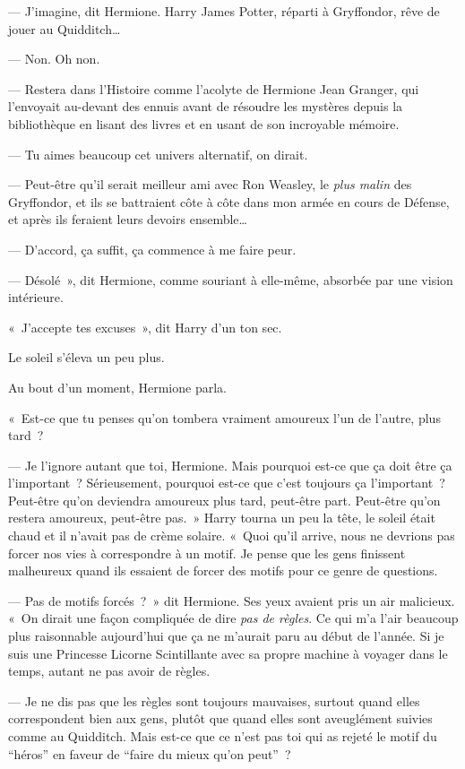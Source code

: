 --- J'imagine, dit Hermione. Harry James Potter, réparti à Gryffondor, rêve de jouer au Quidditch…

--- Non. Oh non.

--- Restera dans l'Histoire comme l'acolyte de Hermione Jean Granger, qui l'envoyait au-devant des ennuis avant de résoudre les mystères depuis la bibliothèque en lisant des livres et en usant de son incroyable mémoire.

--- Tu aimes beaucoup cet univers alternatif, on dirait.

--- Peut-être qu'il serait meilleur ami avec Ron Weasley, le \emph{plus malin} des Gryffondor, et ils se battraient côte à côte dans mon armée en cours de Défense, et après ils feraient leurs devoirs ensemble…

--- D'accord, ça suffit, ça commence à me faire peur.

--- Désolé~», dit Hermione, comme souriant à elle-même, absorbée par une vision intérieure.

«~J'accepte tes excuses~», dit Harry d'un ton sec.

Le soleil s'éleva un peu plus.

Au bout d'un moment, Hermione parla.

«~Est-ce que tu penses qu'on tombera vraiment amoureux l'un de l'autre, plus tard~?

--- Je l'ignore autant que toi, Hermione. Mais pourquoi est-ce que ça doit être ça l'important~? Sérieusement, pourquoi est-ce que c'est toujours ça l'important~? Peut-être qu'on deviendra amoureux plus tard, peut-être part. Peut-être qu'on restera amoureux, peut-être pas.~» Harry tourna un peu la tête, le soleil était chaud et il n'avait pas de crème solaire. «~Quoi qu'il arrive, nous ne devrions pas forcer nos vies à correspondre à un motif. Je pense que les gens finissent malheureux quand ils essaient de forcer des motifs pour ce genre de questions.

--- Pas de motifs forcés~?~» dit Hermione. Ses yeux avaient pris un air malicieux. «~On dirait une façon compliquée de dire \emph{pas de règles}. Ce qui m'a l'air beaucoup plus raisonnable aujourd'hui que ça ne m'aurait paru au début de l'année. Si je suis une Princesse Licorne Scintillante avec sa propre machine à voyager dans le temps, autant ne pas avoir de règles.

--- Je ne dis pas que les règles sont toujours mauvaises, surtout quand elles correspondent bien aux gens, plutôt que quand elles sont aveuglément suivies comme au Quidditch. Mais est-ce que ce n'est pas toi qui as rejeté le motif du “héros” en faveur de “faire du mieux qu'on peut”~?

